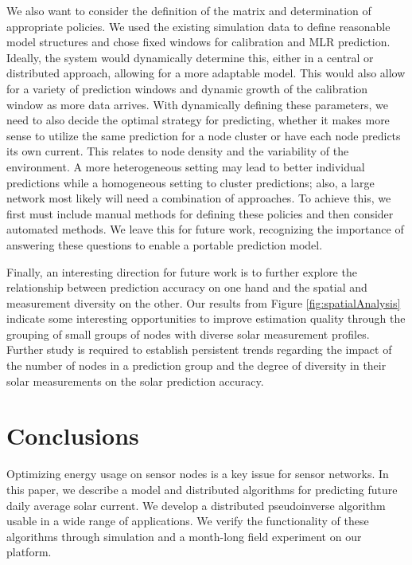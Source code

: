 \documentclass[prodmode,acmtosn]{acmsmall}
\begin{document}
We also want to consider the definition of the matrix and determination of appropriate policies.
We used the existing simulation data to define reasonable model structures and chose fixed windows for calibration and MLR prediction.
Ideally, the system would dynamically determine this, either in a central or distributed approach, allowing for a more adaptable model.
This would also allow for a variety of prediction windows and dynamic growth of the calibration window as more data arrives.
With dynamically defining these parameters, we need to also decide the optimal strategy for predicting, whether it makes more sense to utilize the same prediction for a node cluster or have each node predicts its own current.
This relates to node density and the variability of the environment.
A more heterogeneous setting may lead to better individual predictions while a homogeneous setting to cluster predictions; also, a large network most likely will need a combination of approaches.
To achieve this, we first must include manual methods for defining these policies and then consider automated methods.
We leave this for future work, recognizing the importance of answering these questions to enable a portable prediction model.

Finally,  an interesting direction for future work  is to further explore the relationship between prediction accuracy on one hand and the spatial and measurement diversity on the other.
Our results from Figure \ref{fig:spatialAnalysis} indicate some interesting opportunities to improve estimation quality through the grouping of  small groups of nodes with diverse solar measurement profiles. Further study is required to establish persistent trends regarding the impact of the number of nodes in a prediction group and the degree of diversity in their solar measurements on  the solar prediction accuracy.

\section{Conclusions} \label{sec:solar-conc}
Optimizing energy usage on sensor nodes is a key issue for sensor networks.
In this paper, we describe a model and distributed algorithms for predicting future daily average solar current.
We develop a distributed pseudoinverse algorithm usable in a wide range of applications.
We verify the functionality of these algorithms through simulation and a month-long field experiment on our platform.
\end{document}
